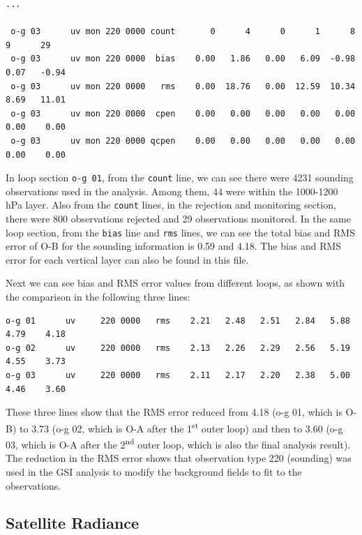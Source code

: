 \begin{scriptsize}
\begin{verbatim}
...

 o-g 03      uv mon 220 0000 count       0      4      0      1      8      9      29
 o-g 03      uv mon 220 0000  bias    0.00   1.86   0.00   6.09  -0.98   0.07   -0.94
 o-g 03      uv mon 220 0000   rms    0.00  18.76   0.00  12.59  10.34   8.69   11.01
 o-g 03      uv mon 220 0000  cpen    0.00   0.00   0.00   0.00   0.00   0.00    0.00
 o-g 03      uv mon 220 0000 qcpen    0.00   0.00   0.00   0.00   0.00   0.00    0.00

\end{verbatim}
\end{scriptsize}

In loop section \verb|o-g 01|, from the \verb|count| line, we can see there were 4231 sounding observations used in the analysis. Among them, 44 were within the 1000-1200 hPa layer. Also from the \verb|count| lines, in the rejection and monitoring section, there were 800 observations rejected and 29 observations monitored. In the same loop section, from the \verb|bias| line and \verb|rms| lines, we can see the total bias and RMS error of O-B for the sounding information is 0.59 and 4.18. The bias and RMS error for each vertical layer can also be found in this file.

Next we can see bias and RMS error values from different loops, as shown with the comparison in the following three lines:

\begin{scriptsize}
\begin{verbatim}
o-g 01      uv     220 0000   rms    2.21   2.48   2.51   2.84   5.88   4.79    4.18
o-g 02      uv     220 0000   rms    2.13   2.26   2.29   2.56   5.19   4.55    3.73
o-g 03      uv     220 0000   rms    2.11   2.17   2.20   2.38   5.00   4.46    3.60
\end{verbatim}
\end{scriptsize}

These three lines show that the RMS error reduced from 4.18 (o-g 01, which is O-B) to 3.73 (o-g 02, which is O-A after the 1\textsuperscript{st} outer loop) and then to 3.60 (o-g 03, which is O-A after the 2\textsuperscript{nd} outer loop, which is also the final analysis result). The reduction in the RMS error shows that observation type 220 (sounding) was used in the GSI analysis to modify the background fields to fit to the observations. 

\subsection{Satellite Radiance}
\label{sec4.5.2}

